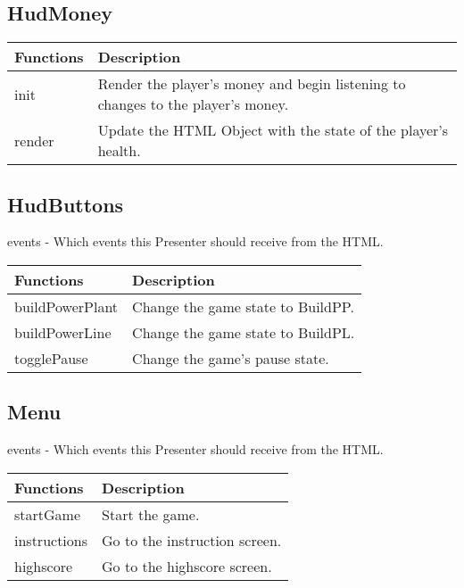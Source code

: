 \subsection*{HudMoney}
	\begin{table}[H]
	\begin{tabular}{p{4cm} | p{8cm} }
	\hline
	\rowcolor{gray}
	Functions & Description \\ \hline
	init & Render the player's money and begin listening to changes to the player's money. \\ \hline
	render & Update the HTML Object with the state of the player's health. \\ \hline
	\end{tabular}
	\end{table}

\subsection*{HudButtons}

	events - Which events this Presenter should receive from the HTML.

	\begin{table}[H]
	\begin{tabular}{p{4cm} | p{8cm} }
	\hline
	\rowcolor{gray}
	Functions & Description \\ \hline
	buildPowerPlant & Change the game state to BuildPP. \\ \hline
	buildPowerLine & Change the game state to BuildPL. \\ \hline
	togglePause & Change the game's pause state. \\ \hline
	\end{tabular}
	\end{table}

\clearpage
\subsection*{Menu}

	events - Which events this Presenter should receive from the HTML.

	\begin{table}[H]
	\begin{tabular}{p{4cm} | p{8cm} }
	\hline
	\rowcolor{gray}
	Functions & Description \\ \hline
	startGame & Start the game. \\ \hline
	instructions & Go to the instruction screen. \\ \hline
	highscore & Go to the highscore screen. \\ \hline
	\end{tabular}
	\end{table}

